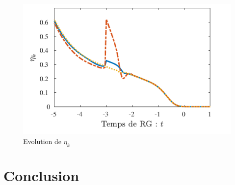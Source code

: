 \documentclass[10pt]{article}
\begin{document}
\begin{multicols}{2}
\begin{figure}[H]
\begin{center}
	\includegraphics[width=0.95\columnwidth]{EtakErrMesu.pdf}
\end{center}
\caption{Evolution de $\eta_k$}
\end{figure}


\section{Conclusion}

\pagebreak





\end{multicols}


\pagebreak

\appendix
\end{document}
